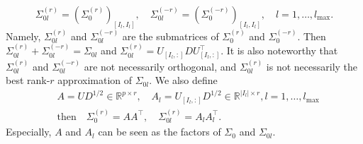 \documentclass[11pt]{article}
\newcommand{\0}{{\mathbf{0}}}
\newcommand{\1}{{\mathbf{1}}}
\begin{document}
\begin{enumerate}[leftmargin=*]
\begin{equation}
	\end{equation}
	\begin{equation*}
	\Sigma_{0l}^{(r)} = (\Sigma_{0}^{(r)})_{[I_l, I_l]}, \quad \Sigma_{0l}^{(-r)} = (\Sigma_{0}^{(-r)})_{[I_l, I_l]}, \quad l=1,\ldots, l_{\max}.
	\end{equation*}
	Namely, $\Sigma_{0l}^{(r)}$ and $\Sigma_{0l}^{(-r)}$ are the submatrices of $\Sigma_{0}^{(r)}$ and $\Sigma_{0}^{(-r)}$. Then $\Sigma_{0l}^{(r)} + \Sigma_{0l}^{(-r)} = \Sigma_{0l}$ and $\Sigma_{0l}^{(r)} = U_{[I_l, :]}DU_{[I_l, :]}^\top$. It is also noteworthy that $\Sigma_{0l}^{(r)}$ and $\Sigma_{0l}^{(-r)}$ are not necessarily orthogonal, and $\Sigma_{0l}^{(r)}$ is not necessarily the best rank-$r$ approximation of $\Sigma_{0l}$. We also define
	\begin{equation}
	\begin{split}
	& A = UD^{1/2} \in \mathbb{R}^{p\times r}, \quad A_l = U_{[I_l, :]}D^{1/2} \in \mathbb{R}^{|I_l|\times r}, l=1,\ldots, l_{\max}\\
	& \text{then} \quad \Sigma_0^{(r)} = AA^\top, \quad \Sigma_{0l}^{(r)} = A_lA_l^\top.
	\end{split}
	\end{equation}
	Especially, $A$ and $A_l$ can be seen as the factors of $\Sigma_0$ and $\Sigma_{0l}$.
	

\end{enumerate}
\end{document}

